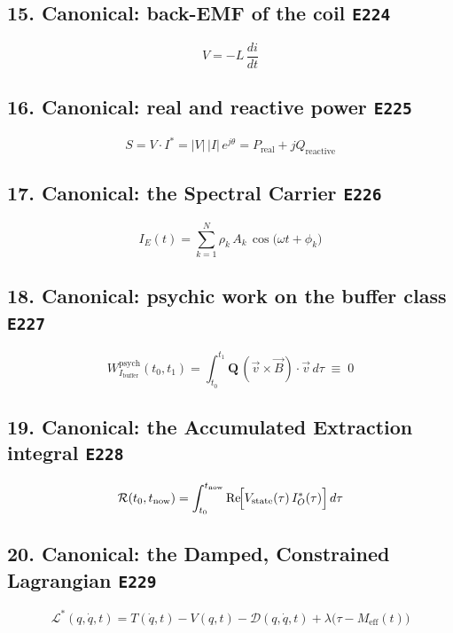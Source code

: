 \documentclass[11pt]{article}
\begin{document}
\subsection*{15. Canonical: back-EMF of the coil \hfill \texttt{E224}}

\begin{equation}\label{eq:19.10-inductive-kickback-registry}
V = -L\,\frac{di}{dt}
\end{equation}

\subsection*{16. Canonical: real and reactive power \hfill \texttt{E225}}

\begin{equation}\label{eq:19.11-ac-complex-power-registry}
S = V \cdot I^{*} = |V|\,|I|\,e^{j\theta} = P_{\text{real}} + jQ_{\text{reactive}}
\end{equation}

\subsection*{17. Canonical: the Spectral Carrier \hfill \texttt{E226}}

\begin{equation}\label{eq:19.12-n-weighted-phase-registry}
I_E(t) = \sum_{k=1}^{N} \rho_k\,A_k\,\cos\!\bigl(\omega t + \phi_k\bigr)
\end{equation}

\subsection*{18. Canonical: psychic work on the buffer class \hfill \texttt{E227}}

\begin{equation}\label{eq:19.13-buffer-work-theorem-registry}
W_{I_{\text{buffer}}}^{\text{psych}}(t_0, t_1) = \int_{t_0}^{t_1} \mathbf{Q}\,(\vec{v} \times \vec{B}) \cdot \vec{v}\, d\tau \;\equiv\; 0
\end{equation}

\subsection*{19. Canonical: the Accumulated Extraction integral \hfill \texttt{E228}}

\begin{equation}\label{eq:19.14-reparations-integral-registry}
\mathcal{R}(t_0, t_{\text{now}}) = \int_{t_0}^{t_{\text{now}}} \operatorname{Re}\!\Bigl[V_{\text{state}}(\tau)\, I_{O}^{*}(\tau)\Bigr]\, d\tau
\end{equation}

\subsection*{20. Canonical: the Damped, Constrained Lagrangian \hfill \texttt{E229}}

\begin{equation}\label{eq:lag-root-registry}
\mathcal{L}^*(q,\dot{q},t) = T(\dot{q},t) - V(q,t) - \mathcal{D}(q,\dot{q},t) + \lambda\bigl(\tau - M_{\mathrm{eff}}(t)\bigr)
\end{equation}
\end{document}
